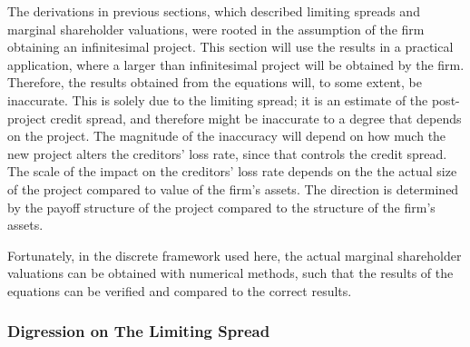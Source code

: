\documentclass[main.tex]{subfiles}
\begin{document}
    The derivations in previous sections, 
    which described limiting spreads and marginal shareholder valuations, 
    were rooted in the assumption of the firm obtaining an infinitesimal project.
    This section will use the results in a practical application,
    where a larger than infinitesimal project will be obtained by the firm.
    Therefore, the results obtained from the equations will, to some extent, be inaccurate.
    This is solely due to the limiting spread;
    it is an estimate of the post-project credit spread,
    and therefore might be inaccurate to a degree that depends on the project.
    The magnitude of the inaccuracy will depend on how much the new project alters
    the creditors' loss rate, since that controls the credit spread.
    The scale of the impact on the creditors' loss rate 
    depends on the the actual size of the project compared to value of the firm's assets.
    The direction is determined by the payoff structure of the project
    compared to the structure of the firm's assets.

    Fortunately, in the discrete framework used here, 
    the actual marginal shareholder valuations can be obtained with numerical methods,
    such that the results of the equations can be verified and compared to the correct results.

    \subsubsection*{Digression on The Limiting Spread}
\end{document}

